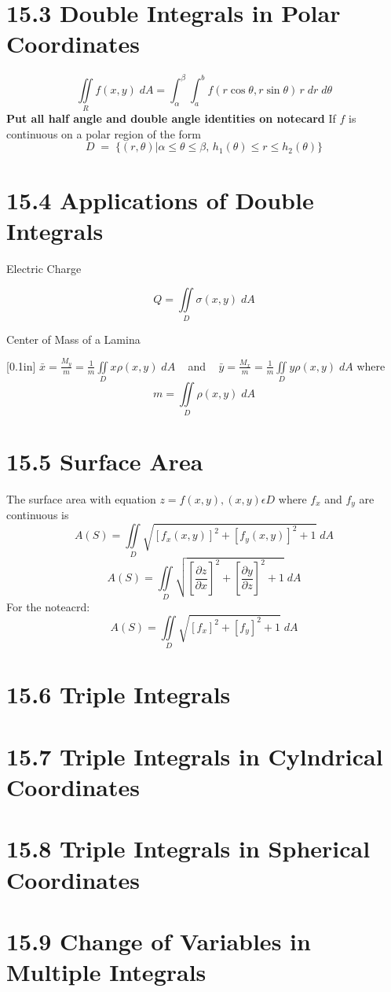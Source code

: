 \documentclass{article}
\begin{document}
\section*{15.3 Double Integrals in Polar Coordinates}
$$\iint\limits_{R} f(x,y) \; dA = \int_{\alpha}^{\beta} \int_{a}^{b} f(r\cos \theta,  r\sin \theta)\, r \; dr \; d\theta$$
\textbf{Put all half angle and double angle identities on notecard}
If $f$ is continuous on a polar region of the form $$D\; = \; \{ (r,\theta )|\alpha \leq \theta \leq \beta , \, h_1(\theta) \leq r \leq h_2(\theta)\}$$

\section*{15.4 Applications of Double Integrals}
\begin{center}
	Electric Charge
\end{center}
$$Q= \iint\limits_{D} \sigma(x,y) \; dA$$
\begin{center} {Center of Mass of a Lamina}\end{center}[0.1in]
$\bar{x} = \frac{M_y}{m} = \frac{1}{m} \iint\limits_D x\rho (x,y)\; dA\;\;\;$ and $\;\;\; \bar{y} = \frac{M_x}{m} = \frac{1}{m} \iint\limits_D y\rho (x,y)\; dA$
where $$m = \iint\limits_D \rho (x,y)\; dA$$
\pagebreak
\section*{15.5 Surface Area}
The surface area with equation $z=f(x,y),(x,y)\epsilon D$ where $f_x$ and $f_y$ are continuous is
$$A(S) = \iint\limits_D \sqrt{[f_x(x,y)]^2+[f_y(x,y)]^2 + 1}\; dA$$
$$A(S) = \iint\limits_D \sqrt{\left[\frac{\partial z}{\partial x}\right]^2+\left[\frac{\partial y}{\partial z}\right]^2 + 1}\; dA$$
For the noteacrd:
$$A(S) = \iint\limits_D \sqrt{\left[f_x\right]^2+\left[f_y\right]^2 + 1}\; dA$$
\section*{15.6 Triple Integrals}
\section*{15.7 Triple Integrals in Cylndrical Coordinates}
\section*{15.8 Triple Integrals in Spherical Coordinates}
\section*{15.9 Change of Variables in Multiple Integrals}
\end{document}
